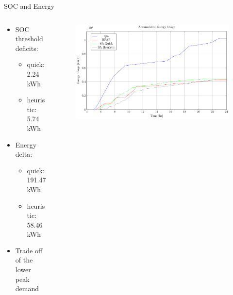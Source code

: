 \documentclass[aspectratio=169,dvipsnames]{beamer}
\begin{document}
\begin{frame}[label={sec:org6d9a871}]{SOC and Energy}
\begin{columns}
\begin{column}{0.3\columnwidth}
\begin{itemize}
\item SOC threshold deficits:
\begin{itemize}
\item quick: 2.24 kWh
\item heuristic: 5.74 kWh
\end{itemize}
\item Energy delta:
\begin{itemize}
\item quick: 191.47 kWh
\item heuristic: 58.46 kWh
\end{itemize}
\item Trade off of the lower peak demand
\end{itemize}
\end{column}

\begin{column}{0.7\columnwidth}
\begin{figure}[htpb]
\centering
    \includegraphics[width=\textwidth]{img/sa-pap-paper-good/energy}
\end{figure}
\end{column}
\end{columns}
\end{frame}
\end{document}
